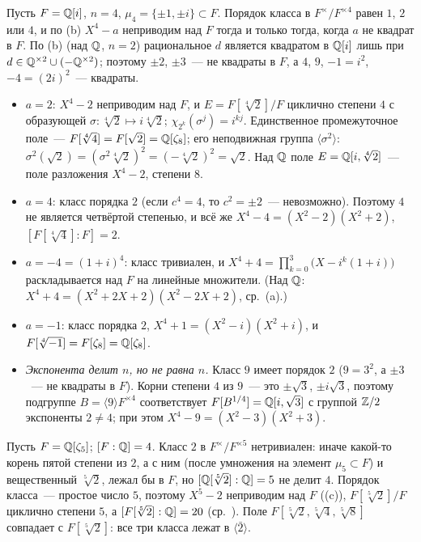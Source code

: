 \begin{example}
Пусть $F=\mathbb Q[i]$, $n=4$, $\mu_4=\{\pm1,\pm i\}\subset F$. Порядок класса в $F^\times/F^{\times4}$ равен $1$, $2$ или $4$, и
по (b) $X^4-a$ неприводим над $F$ тогда и только тогда, когда $a$ не квадрат в $F$. По (b) (над $\mathbb Q$, $n=2$)
рациональное $d$ является квадратом в $\mathbb Q[i]$ лишь при $d\in\mathbb Q^{\times2}\cup(-\mathbb Q^{\times2})$; поэтому $\pm2$, $\pm3$~---
не квадраты в $F$, а $4$, $9$, $-1=i^2$, $-4=(2i)^2$~--- квадраты.
\begin{itemize}[leftmargin=*]
\item $a=2$: $X^4-2$ неприводим над $F$, и $E=F[\sqrt[4]2]/F$ циклично степени $4$ с образующей
$\sigma\colon\sqrt[4]2\mapsto i\sqrt[4]2$; $\chi_{2^k}(\sigma^j)=i^{kj}$. Единственное промежуточное поле~--- $F[\sqrt[4]4]=
F[\sqrt2]=\mathbb Q[\zeta_8]$; его неподвижная группа $\langle\sigma^2\rangle$: $\sigma^2(\sqrt2)=(\sigma^2\sqrt[4]2)^2=
(-\sqrt[4]2)^2=\sqrt2$. Над $\mathbb Q$ поле $E=\mathbb Q[i,\sqrt[4]2]$~--- поле разложения $X^4-2$, степени $8$.
\item $a=4$: класс порядка $2$ (если $c^4=4$, то $c^2=\pm2$~--- невозможно). Поэтому $4$ не является четвёртой
степенью, и всё же $X^4-4=(X^2-2)(X^2+2)$, $[F[\sqrt[4]4]:F]=2$.
\item $a=-4=(1+i)^4$: класс тривиален, и $X^4+4=\prod_{k=0}^{3}\bigl(X-i^k(1+i)\bigr)$ раскладывается над $F$ на линейные
множители. (Над $\mathbb Q$: $X^4+4=(X^2+2X+2)(X^2-2X+2)$, ср.\ (a).)
\item $a=-1$: класс порядка $2$, $X^4+1=(X^2-i)(X^2+i)$, и $F[\sqrt[4]{-1}]=F[\zeta_8]=\mathbb Q[\zeta_8]$.
\item \emph{Экспонента делит $n$, но не равна $n$.} Класс $9$ имеет порядок $2$ ($9=3^2$, а $\pm3$~--- не квадраты в $F$).
Корни степени $4$ из $9$~--- это $\pm\sqrt3$, $\pm i\sqrt3$, поэтому подгруппе $B=\langle9\rangle F^{\times4}$
соответствует $F[B^{1/4}]=\mathbb Q[i,\sqrt3]$ с группой $\mathbb Z/2$ экспоненты $2\ne4$; при этом $X^4-9=(X^2-3)(X^2+3)$.
\end{itemize}
\end{example}

\begin{example}[5.31e: {$\Q[\zeta_5]$}, $n=5$]
Пусть $F=\mathbb Q[\zeta_5]$; $[F:\mathbb Q]=4$. Класс $2$ в $F^\times/F^{\times5}$ нетривиален: иначе какой-то корень пятой степени
из $2$, а с ним (после умножения на элемент $\mu_5\subset F$) и вещественный $\sqrt[5]2$, лежал бы в $F$, но
$[\mathbb Q[\sqrt[5]2]:\mathbb Q]=5$ не делит $4$. Порядок класса~--- простое число $5$, поэтому $X^5-2$ неприводим над $F$ ((c)),
$F[\sqrt[5]2]/F$ циклично степени $5$, а $[F[\sqrt[5]2]:\mathbb Q]=20$ (ср.\ ). Поле $F[\sqrt[5]2,\sqrt[5]4,\sqrt[5]8]$
совпадает с $F[\sqrt[5]2]$: все три класса лежат в $\langle\bar2\rangle$.
\end{example}


